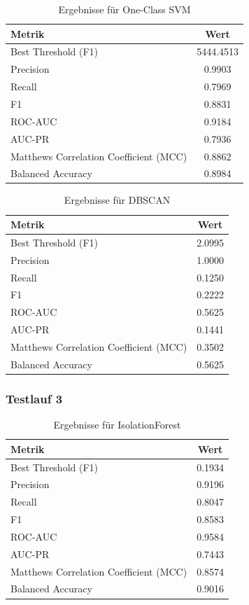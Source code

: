\documentclass[a4paper,12pt]{article}
\begin{document}
	\begin{table}[H]
		\centering
		\begin{tabular}{l c}
			\hline
			Metrik & Wert \\
			\hline
			Best Threshold (F1) & 5444.4513 \\
			Precision & 0.9903 \\
			Recall & 0.7969 \\
			F1 & 0.8831 \\
			ROC-AUC & 0.9184 \\
			AUC-PR & 0.7936 \\
			Matthews Correlation Coefficient (MCC) & 0.8862 \\
			Balanced Accuracy & 0.8984 \\
			\hline
		\end{tabular}
		\caption{Ergebnisse für One-Class SVM}
	\end{table}
	
	\begin{table}[H]
		\centering
		\begin{tabular}{l c}
			\hline
			Metrik & Wert \\
			\hline
			Best Threshold (F1) & 2.0995 \\
			Precision & 1.0000 \\
			Recall & 0.1250 \\
			F1 & 0.2222 \\
			ROC-AUC & 0.5625 \\
			AUC-PR & 0.1441 \\
			Matthews Correlation Coefficient (MCC) & 0.3502 \\
			Balanced Accuracy & 0.5625 \\
			\hline
		\end{tabular}
		\caption{Ergebnisse für DBSCAN}
	\end{table}
	
	\subsubsection{Testlauf 3}
	
	\begin{table}[H]
		\centering
		\begin{tabular}{l c}
			\hline
			Metrik & Wert \\
			\hline
			Best Threshold (F1) & 0.1934 \\
			Precision & 0.9196 \\
			Recall & 0.8047 \\
			F1 & 0.8583 \\
			ROC-AUC & 0.9584 \\
			AUC-PR & 0.7443 \\
			Matthews Correlation Coefficient (MCC) & 0.8574 \\
			Balanced Accuracy & 0.9016 \\
			\hline
		\end{tabular}
		\caption{Ergebnisse für IsolationForest}
	\end{table}
	
\end{document}
